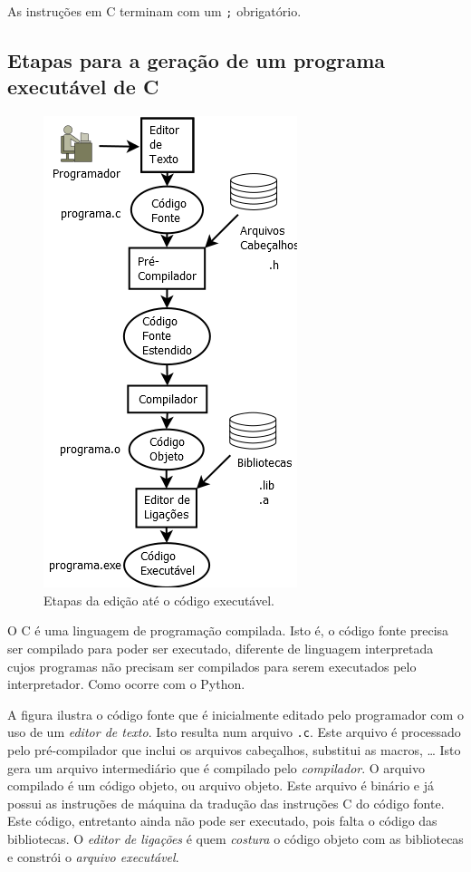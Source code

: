 \documentclass[
]{article}
\begin{document}
As instruções em C terminam com um \texttt{;} obrigatório.

\hypertarget{etapas-para-a-gerauxe7uxe3o-de-um-programa-executuxe1vel-de-c}{%
\subsection{Etapas para a geração de um programa executável de
C}\label{etapas-para-a-gerauxe7uxe3o-de-um-programa-executuxe1vel-de-c}}

\begin{figure}
\centering
\includegraphics{images/etapas_compilacao.png}
\caption{Etapas da edição até o código executável.}
\end{figure}

O C é uma linguagem de programação compilada. Isto é, o código fonte
precisa ser compilado para poder ser executado, diferente de linguagem
interpretada cujos programas não precisam ser compilados para serem
executados pelo interpretador. Como ocorre com o Python.

A figura ilustra o código fonte que é inicialmente editado pelo
programador com o uso de um \emph{editor de texto}. Isto resulta num
arquivo \texttt{.c}. Este arquivo é processado pelo pré-compilador que
inclui os arquivos cabeçalhos, substitui as macros, \ldots{} Isto gera
um arquivo intermediário que é compilado pelo \emph{compilador}. O
arquivo compilado é um código objeto, ou arquivo objeto. Este arquivo é
binário e já possui as instruções de máquina da tradução das instruções
C do código fonte. Este código, entretanto ainda não pode ser executado,
pois falta o código das bibliotecas. O \emph{editor de ligações} é quem
\emph{costura} o código objeto com as bibliotecas e constrói o
\emph{arquivo executável}.
\end{document}
